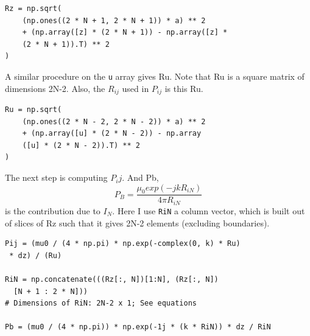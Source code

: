 \documentclass[11pt, a4paper]{article}
\begin{document}
\begin{verbatim}
Rz = np.sqrt(
    (np.ones((2 * N + 1, 2 * N + 1)) * a) ** 2
    + (np.array([z] * (2 * N + 1)) - np.array([z] * 
    (2 * N + 1)).T) ** 2
)
\end{verbatim}   

A similar procedure on the \texttt{u} array gives Ru. Note that Ru is a square matrix of dimensions 2N-2. Also, the $R_{ij}$ used in $P_{ij}$ is this Ru.
\begin{verbatim}
Ru = np.sqrt(
    (np.ones((2 * N - 2, 2 * N - 2)) * a) ** 2
    + (np.array([u] * (2 * N - 2)) - np.array
    ([u] * (2 * N - 2)).T) ** 2
)
\end{verbatim}

The next step is computing $P_ij$. And Pb,$$P_B = \frac{\mu_0exp(-jkR_{iN})}{4\pi R_{iN}}$$ is the contribution due to $I_N$. Here I use \texttt{RiN} a column vector, which is built out of slices of Rz such that it gives 2N-2 elements (excluding boundaries). 
 
\begin{verbatim}
Pij = (mu0 / (4 * np.pi) * np.exp(-complex(0, k) * Ru)
 * dz) / (Ru)

RiN = np.concatenate(((Rz[:, N])[1:N], (Rz[:, N])
  [N + 1 : 2 * N]))
# Dimensions of RiN: 2N-2 x 1; See equations

Pb = (mu0 / (4 * np.pi)) * np.exp(-1j * (k * RiN)) * dz / RiN

\end{verbatim} 
\end{document}
